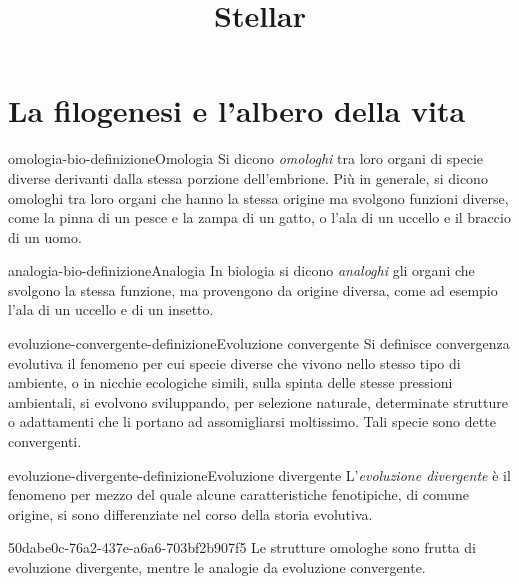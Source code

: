 \documentclass[preview]{standalone}
\begin{document}
\title{Stellar}
\genpage

\section{La filogenesi e l'albero della vita}


\begin{snippetdefinition}{omologia-bio-definizione}{Omologia}
    Si dicono \textit{omologhi} tra loro organi di specie diverse derivanti dalla stessa porzione dell'embrione.
    Più in generale, si dicono omologhi tra loro organi che hanno la stessa origine ma svolgono funzioni diverse, come la pinna di un pesce e la zampa di un gatto, o l'ala di un uccello e il braccio di un uomo.
\end{snippetdefinition}

\begin{snippetdefinition}{analogia-bio-definizione}{Analogia}
    In biologia si dicono \textit{analoghi} gli organi che svolgono la stessa funzione, ma provengono da origine diversa, come ad esempio l'ala di un uccello e di un insetto.
\end{snippetdefinition}

\begin{snippetdefinition}{evoluzione-convergente-definizione}{Evoluzione convergente}
    Si definisce convergenza evolutiva il fenomeno per cui specie diverse che vivono nello stesso tipo di ambiente, o in nicchie ecologiche simili, sulla spinta delle stesse pressioni ambientali, si evolvono sviluppando, per selezione naturale, determinate strutture o adattamenti che li portano ad assomigliarsi moltissimo. Tali specie sono dette convergenti. 
\end{snippetdefinition}

\begin{snippetdefinition}{evoluzione-divergente-definizione}{Evoluzione divergente}
    L'\textit{evoluzione divergente} è il fenomeno per mezzo del quale alcune caratteristiche fenotipiche, di comune origine, si sono differenziate nel corso della storia evolutiva. 
\end{snippetdefinition}

\begin{snippet}{50dabe0c-76a2-437e-a6a6-703bf2b907f5}
    Le strutture omologhe sono frutta di evoluzione divergente, mentre le analogie da
    evoluzione convergente.
\end{snippet}
\end{document}
